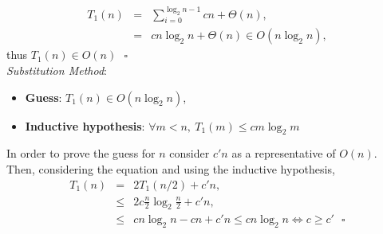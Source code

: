 \documentclass{article}
\begin{document}
	\begin{eqnarray}
	\nonumber
	T_1(n) &=& \sum_{i=0}^{\log_2 n -1 } cn + \Theta(n), \\
	\nonumber
	&=& cn\log_2 n + \Theta(n)  \in O(n\log_2n), 
	\nonumber 
	\end{eqnarray} 
	\noindent thus $T_1(n) \in O(n) ~~~ \square$\\
	
	\noindent \textit{Substitution Method}:
	\begin{itemize}
		\item \textbf{Guess}: $T_1(n) \in O(n\log_2 n)$, 
		\item \textbf{Inductive hypothesis}: $\forall m < n, ~  T_1(m) \leq cm\log_2 m$ 
	\end{itemize} 
	In order to prove the guess for $n$ consider $c'n$ as a representative of $O(n)$. Then, considering the equation and using the inductive hypothesis,
	\begin{eqnarray}
	\nonumber
	T_1(n) &=& 2 T_1 (n/2) + c'n,\\
	\nonumber
	&\leq& 2 c \frac{n}{2} \log_2\frac{n}{2} + c'n,\\
	\nonumber
	 &\leq& cn\log_2 n -cn + c'n \leq cn\log_2 n \Leftrightarrow c \geq c' ~~~ \square
	 \nonumber 
	\end{eqnarray} 
	
\end{document}
